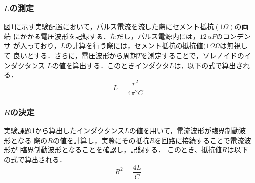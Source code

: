 \subsubsection{$L$の測定}
図1に示す実験配置において，パルス電流を流した際にセメント抵抗$(1\Omega)$の両端
にかかる電圧波形を記録する．ただし，パルス電源内には，$12\,\si{uF}$のコンデンサ
が入っており，$L$の計算を行う際には，セメント抵抗の抵抗値$(1Ω\Omega$は無視して
良いとする．さらに，電圧波形から周期$T$を測定することで，ソレノイドのインダクタンス
$L$の値を算出する．このときインダクタ$L$は，以下の式で算出される．
$$
L=\frac{r^2}{4\pi^2C}
$$


\subsubsection{$R$の決定}
実験課題1から算出したインダクタンス$L$の値を用いて，電流波形が臨界制動波形となる
際の$R$の値を計算し，実際にその抵抗$R$を回路に接続することで電流波形が
臨界制動波形となることを確認し，記録する．
このとき、抵抗値$R$は以下の式で算出される．
$$
R^2=\frac{4L}{C}
$$